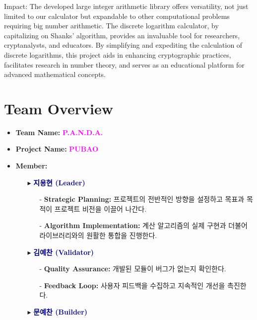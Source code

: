 \documentclass[12pt,a4paper]{article}
\begin{document}
	Impact: The developed large integer arithmetic library offers versatility, not just limited to our calculator but expandable to other computational problems requiring big number arithmetic. The discrete logarithm calculator, by capitalizing on Shanks' algorithm, provides an invaluable tool for researchers, cryptanalysts, and educators. By simplifying and expediting the calculation of discrete logarithms, this project aids in enhancing cryptographic practices, facilitates research in number theory, and serves as an educational platform for advanced mathematical concepts.
	\tableofcontents
	\newpage
	\section{Team Overview}
	\begin{itemize}
		\item \textbf{Team Name:} \textcolor{magenta}{\bf P.A.N.D.A. 
		 }
		\item \textbf{Project Name:} \textcolor{magenta}{\bf PUBAO }
		\item \textbf{Member:}
		\begin{itemize}
			\item[$\blacktriangleright$] \textcolor{darkblue}{\bf 지용현 (Leader)}
			\begin{itemize}
				\item[-] \textbf{Strategic Planning:} 프로젝트의 전반적인 방향을 설정하고 목표과 목적이 프로젝트 비전을 이끌어 나간다.
				\item[-] \textbf{Algorithm Implementation:} 계산 알고리즘의 실제 구현과 더불어 라이브러리와의 원활한 통합을 진행한다.
			\end{itemize}
			\vspace{5pt}
		\item[$\blacktriangleright$] \textcolor{darkblue}{\bf 김예찬 (Validator) }
		\begin{itemize}
			\item[-] \textbf{Quality Assurance:} 개발된 모듈이 버그가 없는지 확인한다.
			\item[-] \textbf{Feedback Loop:} 사용자 피드백을 수집하고 지속적인 개선을 촉진한다.
		\end{itemize}
		\vspace{5pt}
			\item[$\blacktriangleright$] \textcolor{darkblue}{\bf 문예찬 (Builder)}
		\begin{itemize}

\end{itemize}
\end{itemize}
\end{itemize}
\end{document}
